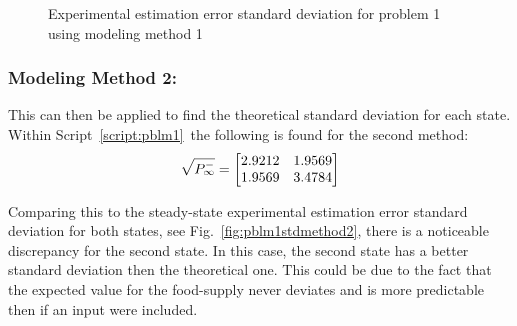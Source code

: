 \documentclass[]{article}
\renewcommand{\lstlistingname}{Script}
\newcommand{\scriptname}{\lstlistingname}
\renewcommand{\figurename}{Fig.}
\begin{document}
			\begin{figure}[h]
				\centering
				\caption{Experimental estimation error standard deviation for problem 1 using modeling method 1}
				\label{fig:pblm1stdmethod1}
			\end{figure}
			
		\subsubsection{Modeling Method 2:}
			This can then be applied to find the theoretical standard deviation for each state. Within \scriptname \ \ref{script:pblm1}\ the following is found for the second method:
			\begin{equation}
				\sqrt{P_\infty^-} = \mqty[2.9212 &1.9569\\ 1.9569 &3.4784]
			\end{equation}
			
			Comparing this to the steady-state experimental estimation error standard deviation for both states, see \figurename \ \ref{fig:pblm1stdmethod2}, there is a noticeable discrepancy for the second state. In this case, the second state has a better standard deviation then the theoretical one. This could be due to the fact that the expected value for the food-supply never deviates and is more predictable then if an input were included.
			
\end{document}
